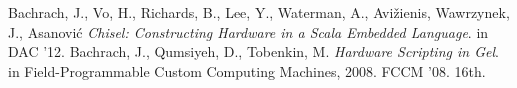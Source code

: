 \documentclass[10pt]{article}
\def\note#1{\noindent{\bf [Note: #1]}}
\begin{document}

\begin{thebibliography}{50}
 Bachrach, J., Vo, H., Richards, B., Lee, Y., Waterman,
  A., Avi\v{z}ienis, Wawrzynek, J., Asanovi\'{c} \textsl{Chisel:
    Constructing Hardware in a Scala Embedded Language}.
in DAC '12.
 Bachrach, J., Qumsiyeh, D., Tobenkin, M. \textsl{Hardware Scripting in Gel}.
in Field-Programmable Custom Computing Machines, 2008. FCCM '08. 16th.
\end{thebibliography}
\end{document}
